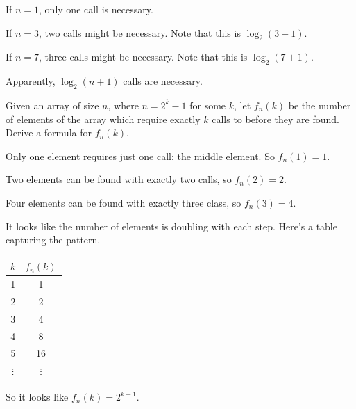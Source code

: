 \begin{prob}
\begin{subprobset}
\begin{subprob}
            \begin{soln}
                If $n = 1$, only one call is necessary.

                If $n = 3$, two calls might be necessary. Note that this is $\log_2 (3 + 1)$.

                If $n = 7$, three calls might be necessary. Note that this is $\log _2 (7 + 1)$.

                Apparently, $\log_2 (n + 1)$ calls are necessary.
            \end{soln}
        \end{subprob}


        \begin{subprob}
            Given an array of size $n$, where $n = 2^{k} - 1$ for some $k$, let
            $f_n(k)$ be the number of elements of the array which require exactly $k$
            calls to  before they are found. Derive a
            formula for $f_n(k)$. 

            \begin{soln}
                Only one element requires just one call: the middle element. So
                $f_n(1) = 1$.

                Two elements can be found with exactly two calls, so $f_n(2) = 2$.
                
                Four elements can be found with exactly three class, so $f_n(3) = 4$.

                It looks like the number of elements is doubling with each step.
                Here's a table capturing the pattern.

                \begin{center}
                \begin{tabular}{cc}\toprule
                    $k$ & $f_n(k)$\\\midrule
                    1 & 1\\
                    2 & 2\\
                    3 & 4\\
                    4 & 8\\
                    5 & 16\\
                    $\vdots$ & $\vdots$\\\bottomrule
                \end{tabular}
                \end{center}

                So it looks like $f_n(k) = 2^{k-1}$.
            \end{soln}
        \end{subprob}


\end{subprobset}
\end{prob}
